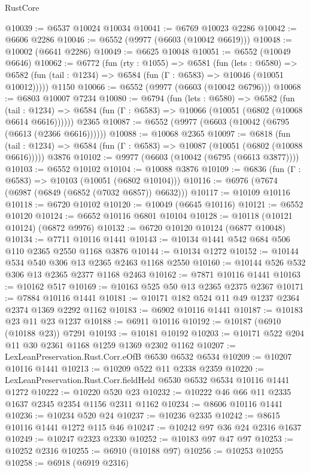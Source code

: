 \begin{lexlean}{RustCore}
\begin{coremodule}
@10039 := @6537 @10024 @10034
@10041 := @6769 @10023 @2286
@10042 := @6606 @2286
@10046 := @6552 (@9977 (@6603 (@10042 @6619)))
@10048 := @10002 (@6641 @2286)
@10049 := @6625 @10048
@10051 := @6552 (@10049 @6646)
@10062 := @6772
    (fun (rty : @1055) =>
    @6581
      (fun (lets : @6580) =>
      @6582 (fun (tail : @1234) => @6584 (fun (Γ : @6583) => @10046 (@10051 @10012)))))
    @1150
@10066 := @6552 (@9977 (@6603 (@10042 @6796)))
@10068 := @6803 @10007 @7234
@10080 := @6794
    (fun (lets : @6580) =>
    @6582
      (fun (tail : @1234) =>
      @6584 (fun (Γ : @6583) => @10066 (@10051 (@6802 (@10068 @6614 @6616))))))
    @2365
@10087 := @6552 (@9977 (@6603 (@10042 (@6795 (@6613 (@2366 @6616))))))
@10088 := @10068 @2365
@10097 := @6818
    (fun (tail : @1234) => @6584 (fun (Γ : @6583) => @10087 (@10051 (@6802 (@10088 @6616)))))
    @3876
@10102 := @9977 (@6603 (@10042 (@6795 (@6613 @3877))))
@10103 := @6552 @10102
@10104 := @10088 @3876
@10109 := @6836 (fun (Γ : @6583) => @10103 (@10051 (@6802 @10104)))
@10116 := @6976 (@7674 (@6987 (@6849 (@6852 (@7032 @6857)) @6632)))
@10117 := @10109 @10116
@10118 := @6720 @10102
@10120 := @10049 (@6645 @10116)
@10121 := @6552 @10120
@10124 := @6652 @10116 @6801 @10104
@10128 := @10118 (@10121 @10124) (@6872 @9976)
@10132 := @6720 @10120 @10124 (@6877 @10048)
@10134 := @7711 @10116 @1441
@10143 := @10134 @1441 @542 @684 @506 @110 @2365 @2550 @1168 @3876
@10144 := @10134 @1272
@10152 := @10144 @534 @540 @306 @13 @2365 @2463 @1168 @2550
@10160 := @10144 @526 @532 @306 @13 @2365 @2377 @1168 @2463
@10162 := @7871 @10116 @1441
@10163 := @10162 @517
@10169 := @10163 @525 @50 @13 @2365 @2375 @2367
@10171 := @7884 @10116 @1441
@10181 := @10171 @182 @524 @11 @49 @1237 @2364 @2374 @1369 @2292 @1162
@10183 := @6902 @10116 @1441
@10187 := @10183 @23 @11 @23 @1237
@10188 := @6911 @10116
@10192 := @10187 (@6910 (@10188 @23)) @7291
@10193 := @10181 @10192
@10203 := @10171 @522 @204 @11 @30 @2361 @1168 @1259 @1369 @2302 @1162
@10207 := LexLeanPreservation.Rust.Corr.eOfB @6530 @6532 @6534
@10209 := @10207 @10116 @1441
@10213 := @10209 @522 @11 @2338 @2359
@10220 := LexLeanPreservation.Rust.Corr.fieldHeld @6530 @6532 @6534 @10116 @1441 @1272
@10222 := @10220 @520 @23
@10232 := @10222 @46 @66 @11 @2335 @1637 @2345 @2354 @1156 @2311 @1162
@10234 := @8606 @10116 @1441
@10236 := @10234 @520 @24
@10237 := @10236 @2335
@10242 := @8615 @10116 @1441 @1272 @115 @46
@10247 := @10242 @97 @36 @24 @2316 @1637
@10249 := @10247 @2323 @2330
@10252 := @10183 @97 @47 @97
@10253 := @10252 @2316
@10255 := @6910 (@10188 @97)
@10256 := @10253 @10255
@10258 := @6918 (@6919 @2316)

\end{coremodule}
\end{lexlean}
